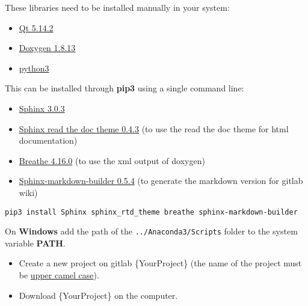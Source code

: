 
These libraries need to be installed manually in your system:

\begin{itemize}
      \item
            \href{https://www.qt.io/}{Qt 5.14.2}
      \item
            \href{http://www.doxygen.nl/download.html}{Doxygen 1.8.13}
      \item
            \href{https://www.anaconda.com/products/individual}{python3}
\end{itemize}

This can be installed through \textbf{pip3} using a single command line:

\begin{itemize}
      \item
            \href{https://pypi.org/project/Sphinx/}{Sphinx 3.0.3}
      \item
            \href{https://sphinx-rtd-theme.readthedocs.io/en/stable/}{Sphinx read
                  the doc theme 0.4.3} (to use the read the doc theme for html
            documentation)
      \item
            \href{https://pypi.org/project/breathe/}{Breathe 4.16.0} (to use the
            xml output of doxygen)
      \item
            \href{https://pypi.org/project/sphinx-markdown-builder/}{Sphinx-markdown-builder
                  0.5.4} (to generate the markdown version for gitlab wiki)
\end{itemize}

\texttt{pip3\ install\ Sphinx\ sphinx\_rtd\_theme\ breathe\ sphinx-markdown-builder}

On \textbf{Windows} add the path of the \texttt{../Anaconda3/Scripts} folder to the system variable \textbf{PATH}.


\begin{itemize}
      \item
            Create a new project on gitlab \{YourProject\} (the name of the
            project must be \href{https://en.wikipedia.org/wiki/Camel_case}{upper
                  camel case}).
\end{itemize}

\begin{itemize}
      \item
            Download \{YourProject\} on the computer.
\end{itemize}


